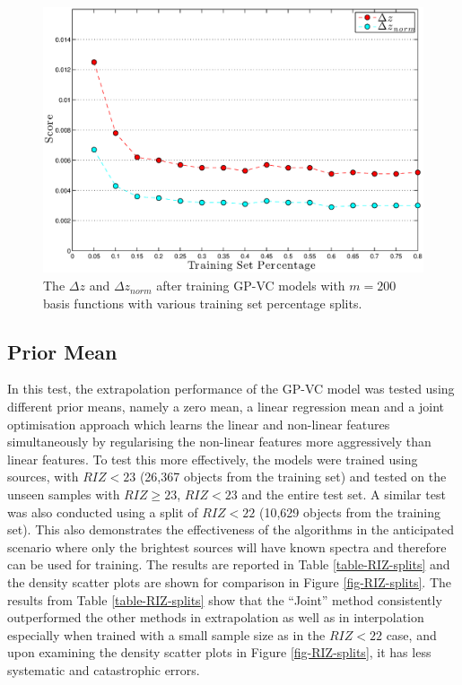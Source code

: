 \documentclass[useAMS,usenatbib,fleqn]{mn2e}
\begin{document}
\begin{figure}
       \centering
        \includegraphics[width=\columnwidth]{figures/percentage.eps}
        \caption{The $\Delta z$ and $\Delta z_{norm}$ after training GP-VC models with $m=200$ basis functions with various training set percentage splits. }
       \label{fig-training-percentage}
\end{figure}

\subsection{Prior Mean}

In this test, the extrapolation performance of the GP-VC model was tested using different prior means, namely a zero mean, a linear regression mean and a joint optimisation approach which learns the linear and non-linear features simultaneously by regularising the non-linear features more aggressively than linear features. To test this more effectively,  the models were trained using sources, with $RIZ<23$ (26,367 objects from the training set) and tested on the unseen samples with $RIZ\ge23$, $RIZ<23$ and the entire test set. A similar test was also conducted using a split of $RIZ<22$ (10,629 objects  from the training set). This also demonstrates the effectiveness of the algorithms in the anticipated scenario where only the brightest sources will have known spectra and therefore can be used for training. The results are reported in Table \ref{table-RIZ-splits} and the density scatter plots are shown for comparison in Figure \ref{fig-RIZ-splits}. The results from Table \ref{table-RIZ-splits} show that the ``Joint'' method consistently outperformed the other methods in extrapolation as well as in interpolation especially when trained with a small sample size as in the $RIZ<22$ case, and upon examining the density scatter plots in Figure \ref{fig-RIZ-splits}, it has less systematic and catastrophic errors.
\end{document}
